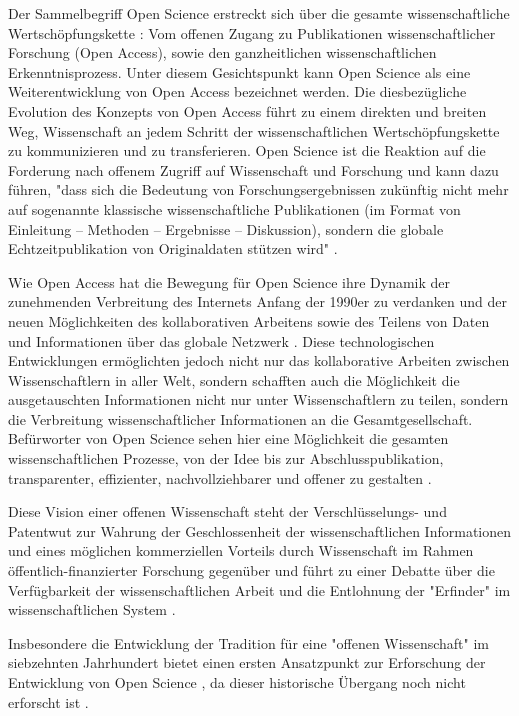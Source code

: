 Der Sammelbegriff Open Science erstreckt sich über die gesamte wissenschaftliche Wertschöpfungskette \cite{Scheliga_2014}: Vom offenen Zugang zu Publikationen wissenschaftlicher Forschung (Open Access), sowie den ganzheitlichen wissenschaftlichen Erkenntnisprozess. Unter diesem Gesichtspunkt kann Open Science als eine Weiterentwicklung von Open Access bezeichnet werden. Die diesbezügliche Evolution des Konzepts von Open Access führt zu einem direkten und breiten Weg, Wissenschaft an jedem Schritt der wissenschaftlichen Wertschöpfungskette zu kommunizieren und zu transferieren. Open Science ist die Reaktion auf die Forderung nach offenem Zugriff auf Wissenschaft und Forschung und kann dazu führen, "dass sich die Bedeutung von Forschungsergebnissen zukünftig nicht mehr auf sogenannte klassische wissenschaftliche Publikationen (im Format von Einleitung – Methoden – Ergebnisse – Diskussion), sondern die globale Echtzeitpublikation von Originaldaten stützen wird" \cite{Stengel_2013}.

Wie Open Access hat die Bewegung für Open Science ihre Dynamik der zunehmenden Verbreitung des Internets Anfang der 1990er zu verdanken \cite{Lievrouw_2010} und der neuen Möglichkeiten des kollaborativen Arbeitens sowie des Teilens von Daten und Informationen über das globale Netzwerk \cite{Meyer_2013}. Diese technologischen Entwicklungen ermöglichten jedoch nicht nur das kollaborative Arbeiten zwischen Wissenschaftlern in aller Welt, sondern schafften auch die Möglichkeit die ausgetauschten Informationen nicht nur unter Wissenschaftlern zu teilen, sondern die Verbreitung wissenschaftlicher Informationen an die Gesamtgesellschaft. Befürworter von Open Science sehen hier eine Möglichkeit die gesamten wissenschaftlichen Prozesse, von der Idee bis zur Abschlusspublikation, transparenter, effizienter, nachvollziehbarer und offener zu gestalten \cite{Woelfle_2011}.

Diese Vision einer offenen Wissenschaft steht der Verschlüsselungs- und Patentwut zur Wahrung der Geschlossenheit der wissenschaftlichen Informationen und eines möglichen kommerziellen Vorteils durch Wissenschaft im Rahmen öffentlich-finanzierter Forschung gegenüber und führt zu einer Debatte über die Verfügbarkeit der wissenschaftlichen Arbeit und die Entlohnung der "Erfinder" im wissenschaftlichen System \cite{suchen}.

Insbesondere die Entwicklung der Tradition für eine "offenen Wissenschaft" im siebzehnten Jahrhundert bietet einen ersten Ansatzpunkt zur Erforschung der Entwicklung von Open Science \cite{Scheliga_2014}, da dieser historische Übergang noch nicht erforscht ist \cite{CREATe_2014}.


